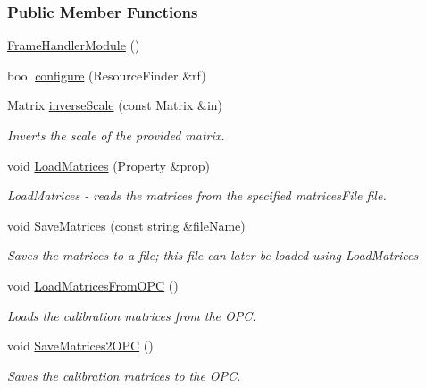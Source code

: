 \subsubsection*{Public Member Functions}
\begin{DoxyCompactItemize}
\item 
\hyperlink{group__referenceFrameHandler_a13f89d223272b8f5e9ad542a8ba94bad}{Frame\+Handler\+Module} ()
\item 
bool \hyperlink{group__referenceFrameHandler_a932e0b19f6b4c4b5dd5e517d5c46c3c2}{configure} (Resource\+Finder \&rf)
\item 
Matrix \hyperlink{group__referenceFrameHandler_ae12d6eba8c62178508bf5ac1a9977bd0}{inverse\+Scale} (const Matrix \&in)
\begin{DoxyCompactList}\small\item\em Inverts the scale of the provided matrix. \end{DoxyCompactList}\item 
void \hyperlink{group__referenceFrameHandler_ac8865a00c58af255bafebb1ed7c525e8}{Load\+Matrices} (Property \&prop)
\begin{DoxyCompactList}\small\item\em Load\+Matrices -\/ reads the matrices from the specified {\itshape matrices\+File} file. \end{DoxyCompactList}\item 
void \hyperlink{group__referenceFrameHandler_aac780e0eb6d561838faa32d0294bc135}{Save\+Matrices} (const string \&file\+Name)
\begin{DoxyCompactList}\small\item\em Saves the matrices to a file; this file can later be loaded using {\ttfamily Load\+Matrices} \end{DoxyCompactList}\item 
void \hyperlink{group__referenceFrameHandler_a6ec74667ad1c117e815d31b30696261b}{Load\+Matrices\+From\+O\+PC} ()
\begin{DoxyCompactList}\small\item\em Loads the calibration matrices from the O\+PC. \end{DoxyCompactList}\item 
void \hyperlink{group__referenceFrameHandler_a2118efdc6d55910b8fcbbf3b4fb9de10}{Save\+Matrices2\+O\+PC} ()
\begin{DoxyCompactList}\small\item\em Saves the calibration matrices to the O\+PC. \end{DoxyCompactList}\item 

\end{DoxyCompactItemize}
